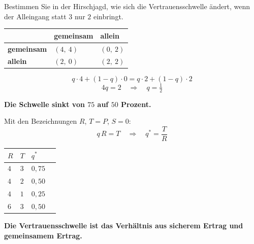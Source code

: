 \begin{aufgabe}
Bestimmen Sie in der Hirschjagd, wie sich die Vertrauensschwelle ändert, wenn der Alleingang statt $3$ nur $2$ einbringt.

\loesung
{}
\begin{center}
{\small
\renewcommand{\arraystretch}{1.6}
\begin{tabular}{@{}P{2.4cm}P{2.4cm}P{2.4cm}@{}}
\toprule
& \textbf{gemeinsam} & \textbf{allein}\\
\midrule
\textbf{gemeinsam} & $(4,\ 4)$ & $(0,\ 2)$\\
\textbf{allein} & $(2,\ 0)$ & $(2,\ 2)$\\
\bottomrule
\end{tabular}}
\end{center}

\[ q\cdot4 + (1-q)\cdot0 = q\cdot2 + (1-q)\cdot2 \]
\[ 4q = 2 \quad\Longrightarrow\quad q = \tfrac12 \]

\begin{center}
\begin{minipage}{0.9\textwidth}
\textbf{Die Schwelle sinkt von $75$ auf $50$ Prozent.}
\end{minipage}
\end{center}

Mit den Bezeichnungen $R$, $T=P$, $S=0$:
\[ q\,R = T \quad\Longrightarrow\quad q^{*} = \frac{T}{R} \]

\begin{center}
{\small
\renewcommand{\arraystretch}{1.48}
\begin{tabular}{@{}P{1.8cm}P{1.8cm}P{2.2cm}P{2.0cm}@{}}
\toprule
$R$ & $T$ & $q^{*}$ & \\
\midrule
$4$ & $3$ & $0{,}75$ & \\
$4$ & $2$ & $0{,}50$ & \\
$4$ & $1$ & $0{,}25$ & \\
$6$ & $3$ & $0{,}50$ & \\
\bottomrule
\end{tabular}}
\end{center}

\begin{center}
\begin{minipage}{0.9\textwidth}
\textbf{Die Vertrauensschwelle ist das Verhältnis aus sicherem Ertrag und gemeinsamem Ertrag.}
\end{minipage}
\end{center}


\end{aufgabe}
